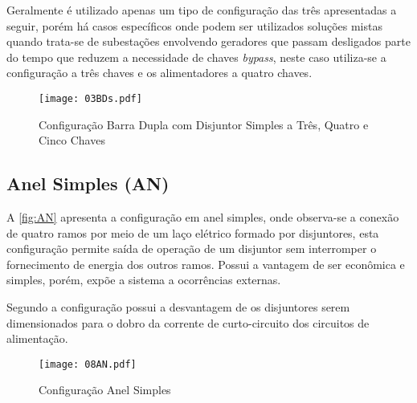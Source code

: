			Geralmente é utilizado apenas um tipo de configuração das três apresentadas a seguir, porém há casos específicos onde podem ser utilizados soluções mistas quando trata-se de subestações envolvendo geradores que passam desligados parte do tempo que reduzem a necessidade de chaves \textit{bypass}, neste caso utiliza-se a configuração a três chaves e os alimentadores a quatro chaves.\par
			\begin{figure}[!htb]
				\caption{Configuração Barra Dupla com Disjuntor Simples a Três, Quatro e Cinco Chaves}
				\centering
				\texttt{[image: 03BDs.pdf]}
				\label{fig:BDs}
				\end{figure}
		\subsection{Anel Simples (AN)}
			A \autoref{fig:AN} apresenta a configuração em anel simples, onde observa-se a conexão de quatro ramos por meio de um laço elétrico formado por disjuntores, esta configuração permite saída de operação de um disjuntor sem interromper o fornecimento de energia dos outros ramos. Possui a vantagem de ser econômica e simples, porém, expõe a sistema a ocorrências externas.\par
			Segundo  a configuração possui a desvantagem de os disjuntores serem dimensionados para o dobro da corrente de curto-circuito dos circuitos de alimentação.\par
			\begin{figure}[!htb]
				\caption{Configuração Anel Simples}
				\centering
				\texttt{[image: 08AN.pdf]}
				\label{fig:AN}
				\end{figure}
